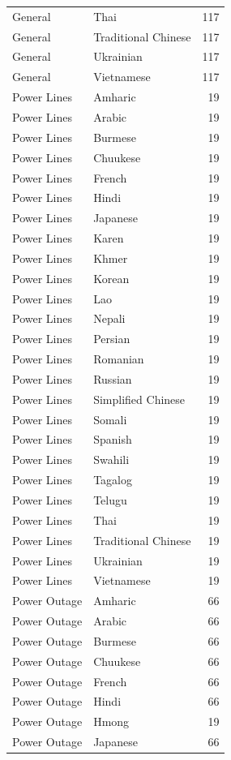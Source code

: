 \begin{longtable}{p{3cm} p{3cm} r}
General & Thai & 117 \\
General & Traditional Chinese & 117 \\
General & Ukrainian & 117 \\
General & Vietnamese & 117 \\
Power Lines & Amharic & 19 \\
Power Lines & Arabic & 19 \\
Power Lines & Burmese & 19 \\
Power Lines & Chuukese & 19 \\
Power Lines & French & 19 \\
Power Lines & Hindi & 19 \\
Power Lines & Japanese & 19 \\
Power Lines & Karen & 19 \\
Power Lines & Khmer & 19 \\
Power Lines & Korean & 19 \\
Power Lines & Lao & 19 \\
Power Lines & Nepali & 19 \\
Power Lines & Persian & 19 \\
Power Lines & Romanian & 19 \\
Power Lines & Russian & 19 \\
Power Lines & Simplified Chinese & 19 \\
Power Lines & Somali & 19 \\
Power Lines & Spanish & 19 \\
Power Lines & Swahili & 19 \\
Power Lines & Tagalog & 19 \\
Power Lines & Telugu & 19 \\
Power Lines & Thai & 19 \\
Power Lines & Traditional Chinese & 19 \\
Power Lines & Ukrainian & 19 \\
Power Lines & Vietnamese & 19 \\
Power Outage & Amharic & 66 \\
Power Outage & Arabic & 66 \\
Power Outage & Burmese & 66 \\
Power Outage & Chuukese & 66 \\
Power Outage & French & 66 \\
Power Outage & Hindi & 66 \\
Power Outage & Hmong & 19 \\
Power Outage & Japanese & 66 \\

\end{longtable}
